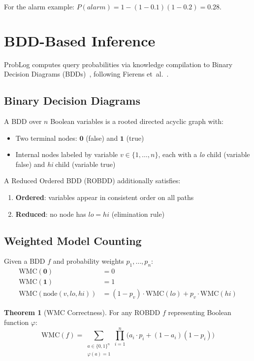 \documentclass[11pt,a4paper]{article}
\theoremstyle{definition}
\newtheorem{theorem}{Theorem}[section]
\begin{document}
For the alarm example: $P(\mathit{alarm}) = 1 - (1-0.1)(1-0.2) = 0.28$.

\section{BDD-Based Inference}

ProbLog computes query probabilities via knowledge compilation to Binary
Decision Diagrams (BDDs)~\cite{bryant1986}, following Fierens et~al.~\cite{fierens2015}.

\subsection{Binary Decision Diagrams}

A BDD over $n$ Boolean variables is a rooted directed acyclic graph with:
\begin{itemize}
\item Two terminal nodes: $\mathbf{0}$ (false) and $\mathbf{1}$ (true)
\item Internal nodes labeled by variable $v \in \{1,\ldots,n\}$, each with
  a \emph{lo} child (variable false) and \emph{hi} child (variable true)
\end{itemize}

A Reduced Ordered BDD (ROBDD) additionally satisfies:
\begin{enumerate}
\item \textbf{Ordered}: variables appear in consistent order on all paths
\item \textbf{Reduced}: no node has $\mathit{lo} = \mathit{hi}$ (elimination rule)
\end{enumerate}

\subsection{Weighted Model Counting}

Given a BDD $f$ and probability weights $p_1, \ldots, p_n$:
\begin{align}
\mathrm{WMC}(\mathbf{0}) &= 0 \\
\mathrm{WMC}(\mathbf{1}) &= 1 \\
\mathrm{WMC}(\mathrm{node}(v, \mathit{lo}, \mathit{hi})) &= (1-p_v) \cdot \mathrm{WMC}(\mathit{lo}) + p_v \cdot \mathrm{WMC}(\mathit{hi})
\end{align}

\begin{theorem}[WMC Correctness]
For any ROBDD $f$ representing Boolean function $\varphi$:
\[
\mathrm{WMC}(f) = \sum_{\substack{a \in \{0,1\}^n \\ \varphi(a) = 1}} \prod_{i=1}^{n} \bigl(a_i \cdot p_i + (1-a_i)(1-p_i)\bigr)
\]
\end{theorem}
\end{document}
